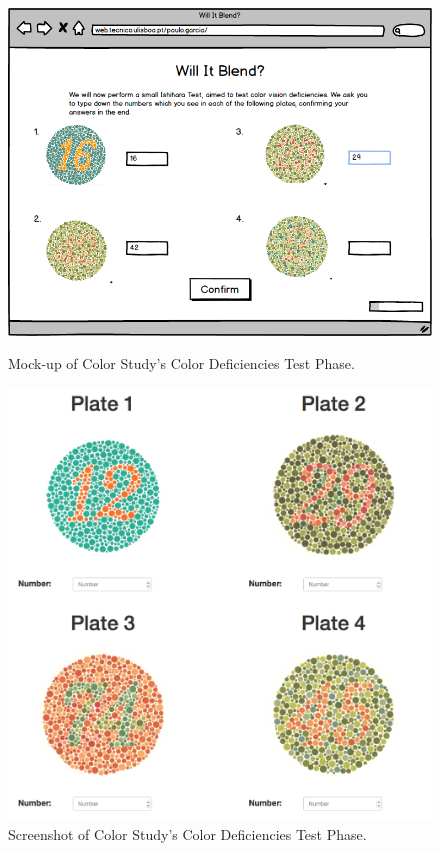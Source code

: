 %
\begin{figure}[htbp]
  \centering
  \begin{minipage}{0.4\textwidth}
		\centering
	  \includegraphics[width=\textwidth]{images/implementation/mockup_ishihara.png}
	  \caption[Mock-up of Color Study's Color Deficiencies Test Phase.]{Mock-up of Color Study's Color Deficiencies Test Phase.}
	  \label{fig:mockup_ishihara}
  \end{minipage} \hfill
	\begin{minipage}{0.4\textwidth}
		\centering
		\includegraphics[width=\textwidth]{images/implementation/screen_ishihara.png}
		\caption[Screenshot of Color Study's Color Deficiencies Test Phase.]{Screenshot of Color Study's Color Deficiencies Test Phase.}
		\label{fig:screen_ishihara}
	\end{minipage}
\end{figure} \par
